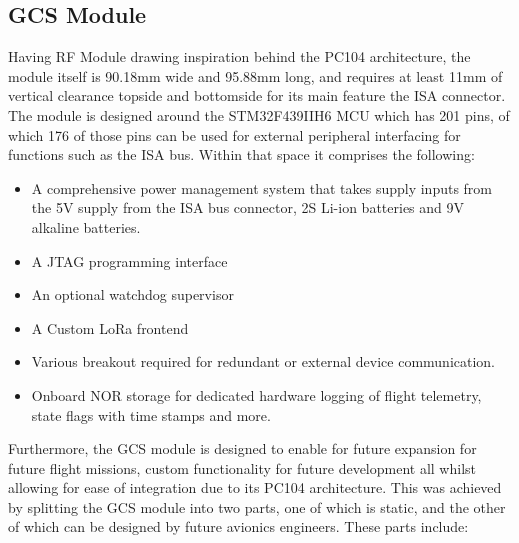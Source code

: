 \subsection{GCS Module}
Having RF Module drawing inspiration behind the PC104 architecture, the module itself is 90.18mm wide and 95.88mm long, and requires at least 11mm of vertical clearance topside and bottomside for its main feature the ISA connector. The module is designed around the STM32F439IIH6 MCU which has 201 pins, of which 176 of those pins can be used for external peripheral interfacing for functions such as the ISA bus.  
Within that space it comprises the following:
\begin{itemize}
    \item A comprehensive power management system that takes supply inputs from the 5V supply from the ISA bus connector, 2S Li-ion batteries and 9V alkaline batteries.
    \item A JTAG programming interface
    \item An optional watchdog supervisor
    \item A Custom LoRa frontend
    \item Various breakout required for redundant or external device communication. 
    \item Onboard NOR storage for dedicated hardware logging of flight telemetry, state flags with time stamps and more.
\end{itemize}
Furthermore, the GCS module is designed to enable for future expansion for future flight missions, custom functionality for future development all whilst allowing for ease of integration due to its PC104 architecture. 
This was achieved by splitting the GCS module into two parts, one of which is static, and the other of which can be designed by future avionics engineers. These parts include:
